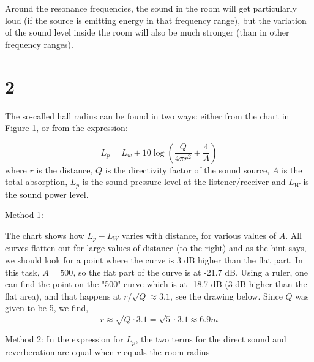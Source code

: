 \documentclass{article}
\begin{document}
Around the resonance frequencies, the sound in the room will get particularly loud (if the source is emitting energy in that frequency range), but the variation of the sound level inside the room will also be much stronger (than in other frequency ranges).




\section*{2}

The so-called hall radius can be found in two ways: either from the chart in Figure 1, or from the expression:

\begin{equation}
    L_p = L_w + 10 \log(\frac{Q}{4 \pi r^2}+\frac{4}{A})
\end{equation}
where $r$ is the distance, $Q$ is the directivity factor of the sound source, $A$ is the total absorption, $L_p$ is the sound pressure level at the listener/receiver and $L_W$ is the sound power level.

Method 1:

The chart shows how $L_p - L_W$ varies with distance, for various values of $A$. All curves flatten out for large values of distance (to the right) and as the hint says, we should look for a point where the curve is 3 dB higher than the flat part. In this task, $A=500$, so the flat part of the curve is at -21.7 dB. Using a ruler, one can find the point on the "500"-curve which is at -18.7 dB (3 dB higher than the flat area), and that happens at $r/\sqrt{Q} \approx 3.1$, see the drawing below. Since $Q$ was given to be 5, we find,
\[
r \approx \sqrt{Q} \cdot 3.1  = \sqrt{5} \cdot 3.1 \approx 6.9 m
\]

Method 2:
In the expression for $L_p$, the two terms for the direct sound and reverberation are equal when $r$ equals the room radius
\end{document}

